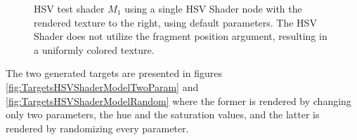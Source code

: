 \begin{figure}[!h]
\centering
{}
\caption{HSV test shader $M_1$ using a single HSV Shader node with the rendered texture to the right, using default parameters. The HSV Shader does not utilize the fragment position argument, resulting in a uniformly colored texture.}
\label{fig:M1NodeGraphAndDefaultRender}
\end{figure}

The two generated targets are presented in figures \ref{fig:TargetsHSVShaderModelTwoParam} and \ref{fig:TargetsHSVShaderModelRandom} where the former is rendered by changing only two parameters, the hue and the saturation values, and the latter is rendered by randomizing every parameter.

